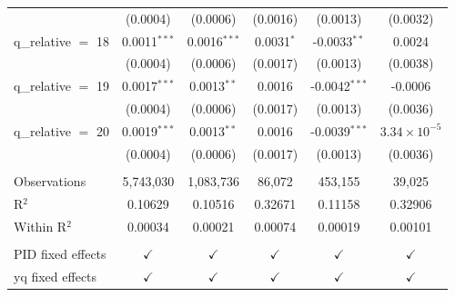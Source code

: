 \begin{tabular}{lccccc}
                        & (0.0004)        & (0.0006)               & (0.0016)          & (0.0013)                      & (0.0032)\\   
   q\_relative $=$ 18   & 0.0011$^{***}$  & 0.0016$^{***}$         & 0.0031$^{*}$      & -0.0033$^{**}$                & 0.0024\\   
                        & (0.0004)        & (0.0006)               & (0.0017)          & (0.0013)                      & (0.0038)\\   
   q\_relative $=$ 19   & 0.0017$^{***}$  & 0.0013$^{**}$          & 0.0016            & -0.0042$^{***}$               & -0.0006\\   
                        & (0.0004)        & (0.0006)               & (0.0017)          & (0.0013)                      & (0.0036)\\   
   q\_relative $=$ 20   & 0.0019$^{***}$  & 0.0013$^{**}$          & 0.0016            & -0.0039$^{***}$               & $3.34\times 10^{-5}$\\    
                        & (0.0004)        & (0.0006)               & (0.0017)          & (0.0013)                      & (0.0036)\\   
    \\
   Observations         & 5,743,030       & 1,083,736              & 86,072            & 453,155                       & 39,025\\  
   R$^2$                & 0.10629         & 0.10516                & 0.32671           & 0.11158                       & 0.32906\\  
   Within R$^2$         & 0.00034         & 0.00021                & 0.00074           & 0.00019                       & 0.00101\\  
    \\
   PID fixed effects    & $\checkmark$    & $\checkmark$           & $\checkmark$      & $\checkmark$                  & $\checkmark$\\   
   yq fixed effects     & $\checkmark$    & $\checkmark$           & $\checkmark$      & $\checkmark$                  & $\checkmark$\\   
   \bottomrule
\end{tabular}
\par\endgroup


